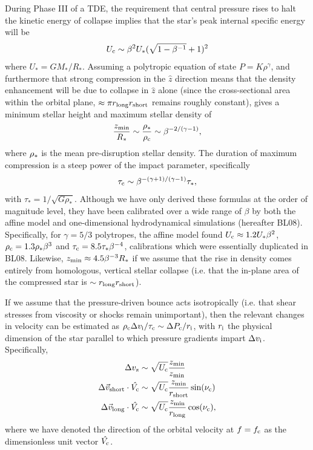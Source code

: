 \documentclass[useAMS, twocolumn, usenatbib]{mn2e}
\begin{document}
During Phase III of a TDE, the requirement that central pressure rises to halt the kinetic energy of collapse implies that the star's peak internal specific energy will be
\begin{equation}
U_{\rm c} \sim \beta^2 U_* (\sqrt{1-\beta^{-1}} +1)^2
\end{equation}
where $U_*=GM_*/R_*$.  Assuming a polytropic equation of state $P=K\rho^\gamma$, and furthermore that strong compression in the $\hat{z}$ direction means that the density enhancement will be due to collapse in $\hat{z}$ alone (since the cross-sectional area within the orbital plane, $\approx \pi r_{\rm long} r_{\rm short}$ remains roughly constant), gives a minimum stellar height and maximum stellar density of
\begin{equation}
\frac{z_{\rm min}}{R_*} \sim \frac{\rho_*}{\rho_{\rm c}} \sim \beta^{-2/(\gamma -1)},
\end{equation}
where $\rho_{\rm *}$ is the mean pre-disruption stellar density.  The duration of maximum compression is a steep power of the impact parameter, specifically 
\begin{equation}
\tau_{\rm c} \sim \beta^{-(\gamma+1)/(\gamma-1)}\tau_*,
\end{equation}
with $\tau_*=1/\sqrt{G\rho_*}$.  Although we have only derived these formulas at the order of magnitude level, they have been calibrated over a wide range of $\beta$ by both the affine model \citep{LuminetCarter86} and one-dimensional hydrodynamical simulations \citep{BrassartLuminet08} (hereafter BL08).  Specifically, for $\gamma=5/3$ polytropes, the affine model found $U_{\rm c}\approx 1.2 U_*\beta^2$, $\rho_{\rm c}=1.3\rho_*\beta^3$ and $\tau_{\rm c}=8.5\tau_*\beta^{-4}$, calibrations which were essentially duplicated in BL08.  Likewise, $z_{\rm min}\approx 4.5 \beta^{-3} R_*$ if we assume that the rise in density comes entirely from homologous, vertical stellar collapse (i.e. that the in-plane area of the compressed star is $\sim r_{\rm long} r_{\rm short}$).

If we assume that the pressure-driven bounce acts isotropically (i.e. that shear stresses from viscosity or shocks remain unimportant), then the relevant changes in velocity can be estimated as $\rho_{\rm c}\Delta v_{\rm i}/\tau_{\rm c} \sim \Delta P_{\rm c}/r_{\rm i}$, with $r_{\rm i}$ the physical dimension of the star parallel to which pressure gradients impart $\Delta v_{\rm i}$.  Specifically,
\begin{align}
\Delta v_{\rm z} &\sim \sqrt{U_{\rm c}} \frac{z_{\rm min}}{z_{\rm min}}\notag  \\ 
\Delta \vec{v}_{\rm short}\cdot \hat{V_{\rm c}} &\sim \sqrt{U_{\rm c}} \frac{z_{\rm min}}{r_{\rm short}}\sin (\nu_{\rm c}) \\
\Delta \vec{v}_{\rm long}\cdot \hat{V_{\rm c}} &\sim \sqrt{U_{\rm c}} \frac{z_{\rm min}}{r_{\rm long}}\cos (\nu_{\rm c}), \notag
\end{align}
where we have denoted the direction of the orbital velocity at $f=f_{\rm c}$ as the dimensionless unit vector $\hat{V_{\rm c}}$.  
\end{document}
